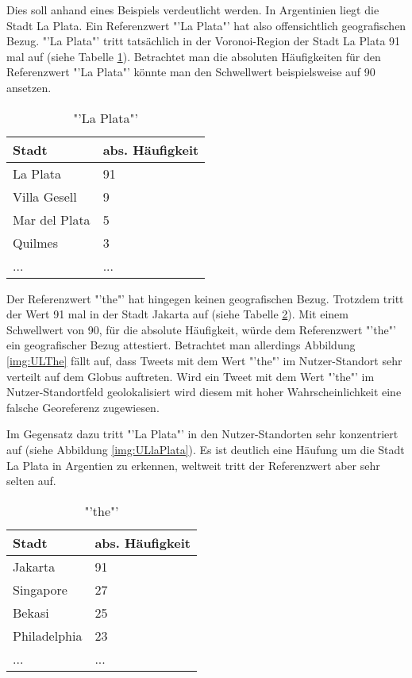 			Dies soll anhand eines Beispiels verdeutlicht werden.
			In Argentinien liegt die Stadt La Plata. 
			Ein Referenzwert "'La Plata"' hat also offensichtlich geografischen Bezug.
			"'La Plata"' tritt tatsächlich in der Voronoi-Region der Stadt La Plata 91 mal auf (siehe Tabelle \ref{tab:laPlataAbs}).			 
			Betrachtet man die absoluten Häufigkeiten für den Referenzwert "'La Plata"' könnte man den Schwellwert beispielsweise auf 90 ansetzen.

			\begin{table}[h]
				\centering
				\caption{"'La Plata"'}
				\label{tab:laPlataAbs}
				\begin{tabular}{|l|l|}
				\hline
				Stadt            & abs. Häufigkeit  \\ \hline \hline
				La Plata         & 91              \\ \hline
				Villa Gesell     & 9               \\ \hline
				Mar del Plata    & 5               \\ \hline
				Quilmes          & 3               \\ \hline
				... & ... \\ \hline
				\end{tabular}
			\end{table}

			Der Referenzwert "'the"' hat hingegen keinen geografischen Bezug.
			Trotzdem tritt der Wert 91 mal in der Stadt Jakarta auf (siehe Tabelle \ref{tab:theAbs}). 
			Mit einem Schwellwert von 90, für die absolute Häufigkeit, würde dem Referenzwert "'the"' ein geografischer Bezug attestiert.
			Betrachtet man allerdings Abbildung \ref{img:ULThe} fällt auf, dass Tweets mit dem Wert "'the"' im Nutzer-Standort sehr verteilt auf dem Globus auftreten.
			Wird ein Tweet mit dem Wert "'the"' im Nutzer-Standortfeld geolokalisiert wird diesem mit hoher Wahrscheinlichkeit eine falsche Georeferenz zugewiesen.

			Im Gegensatz dazu tritt "'La Plata"' in den Nutzer-Standorten sehr konzentriert auf (siehe Abbildung \ref{img:ULlaPlata}).
			Es ist deutlich eine Häufung um die Stadt La Plata in Argentien zu erkennen, weltweit tritt der Referenzwert aber sehr selten auf.

			\begin{table}[h]
				\centering
				\caption{"'the"'}
				\label{tab:theAbs}
				\begin{tabular}{|l|l|}
				\hline
				Stadt             & abs. Häufigkeit \\ \hline \hline
				Jakarta           & 91              \\ \hline
				Singapore         & 27              \\ \hline
				Bekasi            & 25              \\ \hline
				Philadelphia      & 23              \\ \hline
				... & ... \\ \hline
				\end{tabular}
				\end{table}

